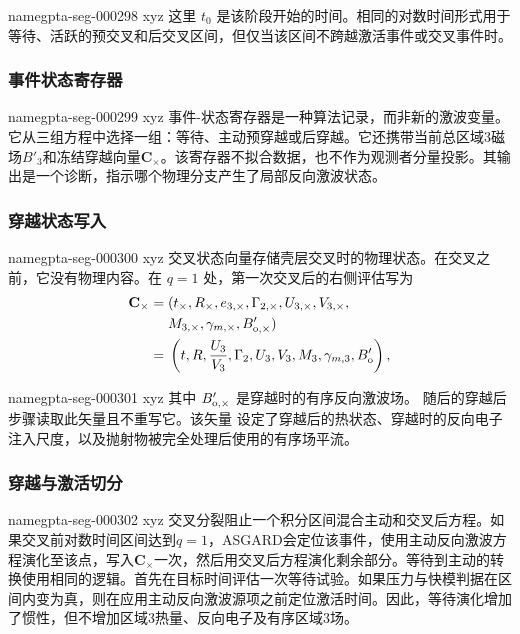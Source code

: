 \documentclass[twocolumn]{aastex702}
\makeatletter
\newcommand{\asgard}{\textsc{ASGARD}}
\providecommand{\gptareaderanchor}[1]{\pdfdest name{#1} xyz}%
\providecommand{\gptareaderanchor}[1]{\special{pdf:dest (#1) [ @thispage /XYZ @xpos @ypos null ]}}%
\makeatother
\begin{document}
\gptareaderanchor{gpta-seg-000298}%
这里 \(t_0\) 是该阶段开始的时间。相同的对数时间形式用于等待、活跃的预交叉和后交叉区间，但仅当该区间不跨越激活事件或交叉事件时。

\subsubsection{事件状态寄存器}


\gptareaderanchor{gpta-seg-000299}%
事件-状态寄存器是一种算法记录，而非新的激波变量。它从三组方程中选择一组：等待、主动预穿越或后穿越。它还携带当前总区域3磁场\(B'_3\)和冻结穿越向量\(\mathbf C_\times\)。该寄存器不拟合数据，也不作为观测者分量投影。其输出是一个诊断，指示哪个物理分支产生了局部反向激波状态。

\subsubsection{穿越状态写入}


\gptareaderanchor{gpta-seg-000300}%
交叉状态向量存储壳层交叉时的物理状态。在交叉之前，它没有物理内容。在 \(q=1\) 处，第一次交叉后的右侧评估写为
\begin{equation}
\begin{aligned}
\mathbf C_\times={}&(t_\times,R_\times,e_{3,\times},\Gamma_{2,\times},
U_{3,\times},V_{3,\times},\\
&M_{3,\times},\gamma_{m,\times},B'_{{\rm o},\times})\\
={}&\left(t,R,\frac{U_3}{V_3},\Gamma_2,U_3,V_3,
M_3,\gamma_{m,3},B'_{\rm o}\right),
\end{aligned}
\end{equation}

\gptareaderanchor{gpta-seg-000301}%
其中 \(B'_{{\rm o},\times}\) 是穿越时的有序反向激波场。
随后的穿越后步骤读取此矢量且不重写它。该矢量
设定了穿越后的热状态、穿越时的反向电子注入尺度，以及抛射物被完全处理后使用的有序场平流。

\subsubsection{穿越与激活切分}


\gptareaderanchor{gpta-seg-000302}%
交叉分裂阻止一个积分区间混合主动和交叉后方程。如果交叉前对数时间区间达到\(q=1\)，\asgard{}会定位该事件，使用主动反向激波方程演化至该点，写入\(\mathbf C_\times\)一次，然后用交叉后方程演化剩余部分。等待到主动的转换使用相同的逻辑。首先在目标时间评估一次等待试验。如果压力与快模判据在区间内变为真，则在应用主动反向激波源项之前定位激活时间。因此，等待演化增加了惯性，但不增加区域3热量、反向电子及有序区域3场。
\end{document}
